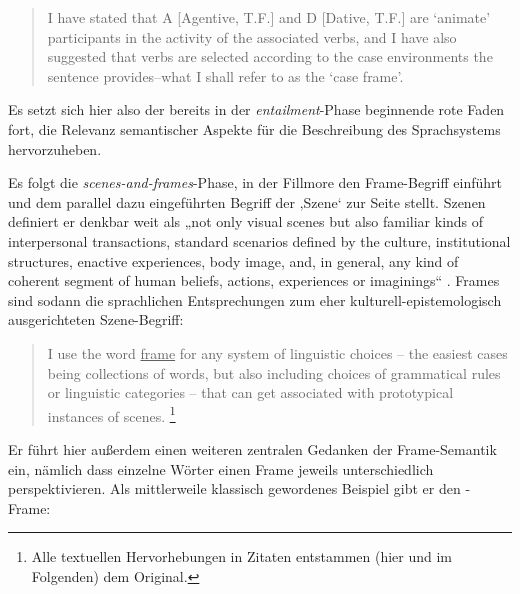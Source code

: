 \begin{quote}
I have stated that A {[}Agentive, T.F.{]} and D {[}Dative, T.F.{]} are `animate' participants in the activity of the associated verbs, and I have also suggested that verbs are selected according to the case environments the sentence provides--what I shall refer to as the `case frame'. \autocite[26]{fillmoreCaseCase1968}
\end{quote}

Es setzt sich hier also der bereits in der \emph{entailment}-Phase beginnende rote Faden fort, die Relevanz semantischer Aspekte für die Beschreibung des Sprachsystems hervorzuheben.

Es folgt die \emph{scenes-and-frames}-Phase, in der Fillmore den Frame-Begriff einführt und dem parallel dazu eingeführten Begriff der ‚Szene` zur Seite stellt. Szenen definiert er denkbar weit als „not only visual scenes but also familiar kinds of interpersonal transactions, standard scenarios defined by the culture, institutional structures, enactive experiences, body image, and, in general, any kind of coherent segment of human beliefs, actions, experiences or imaginings`` \autocite*[124]{fillmoreAlternativeChecklistTheories1975}. Frames sind sodann die sprachlichen Entsprechungen zum eher kulturell-epistemologisch ausgerichteten Szene-Begriff:

\begin{quote}
I use the word \underline{frame} for any system of linguistic choices -- the easiest cases being collections of words, but also including choices of grammatical rules or linguistic categories -- that can get associated with prototypical instances of scenes. \autocite[124]{fillmoreAlternativeChecklistTheories1975}\footnote{Alle textuellen Hervorhebungen in Zitaten entstammen (hier und im Folgenden) dem Original.}
\end{quote}

Er führt hier außerdem einen weiteren zentralen Gedanken der Frame-Semantik ein, nämlich dass einzelne Wörter einen Frame jeweils unterschiedlich perspektivieren. Als mittlerweile klassisch gewordenes Beispiel gibt er den -Frame:

